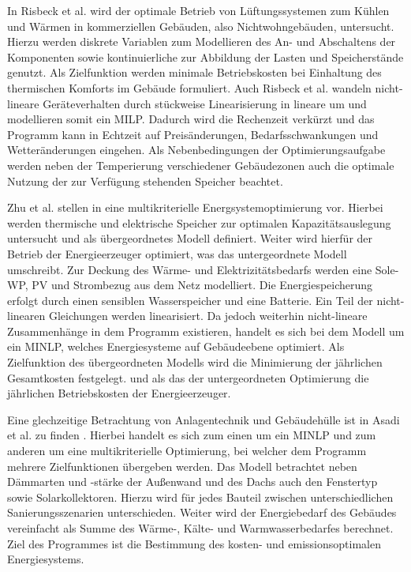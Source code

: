 In Risbeck et al. \cite{Risbeck.2017} wird der optimale Betrieb von Lüftungssystemen zum Kühlen und Wärmen in kommerziellen Gebäuden, also Nichtwohngebäuden, untersucht.
Hierzu werden diskrete Variablen zum Modellieren des An- und Abschaltens der Komponenten sowie kontinuierliche zur Abbildung der Lasten und Speicherstände genutzt.
Als Zielfunktion werden minimale Betriebskosten bei Einhaltung des thermischen Komforts im Gebäude formuliert.
Auch Risbeck et al. wandeln nicht-lineare Geräteverhalten durch stückweise Linearisierung in lineare um und modellieren somit ein MILP.
Dadurch wird die Rechenzeit verkürzt und das Programm kann in Echtzeit auf Preisänderungen, Bedarfsschwankungen und Wetteränderungen eingehen.
Als Nebenbedingungen der Optimierungsaufgabe werden neben der Temperierung verschiedener Gebäudezonen auch die optimale Nutzung der zur Verfügung stehenden Speicher beachtet.

Zhu et al. stellen in \cite{Zhu.2019} eine multikriterielle Energsystemoptimierung vor.
Hierbei werden thermische und elektrische Speicher zur optimalen Kapazitätsauslegung untersucht und als übergeordnetes Modell definiert.
Weiter wird hierfür der Betrieb der Energieerzeuger optimiert, was das untergeordnete Modell umschreibt.
Zur Deckung des Wärme- und Elektrizitätsbedarfs werden eine Sole-WP, PV und Strombezug aus dem Netz modelliert.
Die Energiespeicherung erfolgt durch einen sensiblen Wasserspeicher und eine Batterie.
Ein Teil der nicht-linearen Gleichungen werden linearisiert. 
Da jedoch weiterhin nicht-lineare Zusammenhänge in dem Programm existieren, handelt es sich bei dem Modell um ein MINLP, welches Energiesysteme auf Gebäudeebene optimiert.
Als Zielfunktion des übergeordneten Modells wird die Minimierung der jährlichen Gesamtkosten festgelegt.
und als das der untergeordneten Optimierung die jährlichen Betriebskosten der Energieerzeuger.

Eine glechzeitige Betrachtung von Anlagentechnik und Gebäudehülle ist in Asadi et al. zu finden \cite{Asadi.2012}.
Hierbei handelt es sich zum einen um ein MINLP und zum anderen um eine multikriterielle Optimierung, bei welcher dem Programm mehrere Zielfunktionen übergeben werden.
Das Modell betrachtet neben Dämmarten und -stärke der Außenwand und des Dachs auch den Fenstertyp sowie Solarkollektoren. 
Hierzu wird für jedes Bauteil zwischen unterschiedlichen Sanierungsszenarien unterschieden.
Weiter wird der Energiebedarf des Gebäudes vereinfacht als Summe des Wärme-, Kälte- und Warmwasserbedarfes berechnet.
Ziel des Programmes ist die Bestimmung des kosten- und emissionsoptimalen Energiesystems.

